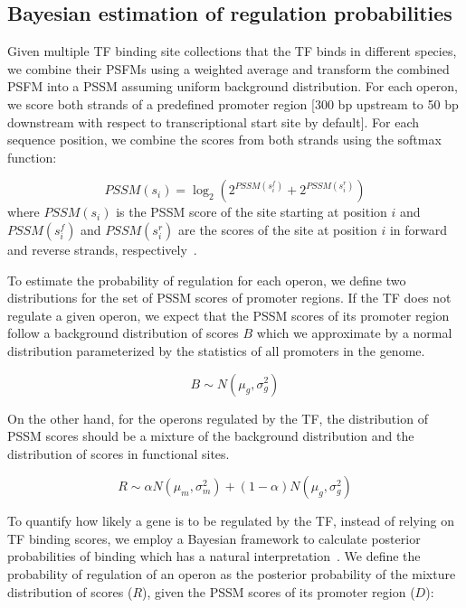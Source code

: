 \subsection{Bayesian estimation of regulation probabilities}

Given multiple TF binding site collections that the TF binds in different
species, we combine their PSFMs using a weighted average and transform the
combined PSFM into a PSSM assuming uniform background distribution. For each
operon, we score both strands of a predefined promoter region [300 bp upstream
to 50 bp downstream with respect to transcriptional start site by default]. For
each sequence position, we combine the scores from both strands using the
softmax function:

\begin{equation}
  PSSM(s_i) = \log_2 (2^{PSSM(s_i^f)} + 2^{PSSM(s_i^r)})
\end{equation}
where $PSSM(s_i )$ is the PSSM score of the site starting at position $i$ and
$PSSM(s_i^f)$ and $PSSM(s_i^r)$ are the scores of the site at position $i$ in
forward and reverse strands, respectively~\cite{hobbs2016bayesian}.

To estimate the probability of regulation for each operon, we define two
distributions for the set of PSSM scores of promoter regions. If the TF does
not regulate a given operon, we expect that the PSSM scores of its promoter
region follow a background distribution of scores $B$ which we approximate by a
normal distribution parameterized by the statistics of all promoters in the
genome.

\begin{equation}
  B \sim N(\mu_g, \sigma_g^2)
\end{equation}

On the other hand, for the operons regulated by the TF, the distribution of
PSSM scores should be a mixture of the background distribution and the
distribution of scores in functional sites.

\begin{equation}
R \sim \alpha N(\mu_m, \sigma_m^2) + (1-\alpha) N(\mu_g, \sigma_g^2)
\end{equation}

To quantify how likely a gene is to be regulated by the TF, instead of relying
on TF binding scores, we employ a Bayesian framework to calculate posterior
probabilities of binding which has a natural
interpretation~\cite{hobbs2016bayesian}. We define the probability of
regulation of an operon as the posterior probability of the mixture
distribution of scores ($R$), given the PSSM scores of its promoter region
($D$):

